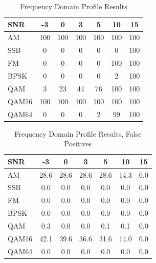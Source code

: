 \begin{table}
\caption{Frequency Domain Profile Results}
\centering
\begin{tabular}{ l | c | c | c | c | c | c } \hline
SNR   &	 -3 &	 0 &	 3 &	 5 &	 10 &	 15\\ \hline \hline 
AM    &	 100 &	 100 &	 100 &	 100 &	 100 &	 100 \\ \hline 
 SSB   &	 0 &	 0 &	 0 &	 0 &	 0 &	 100 \\ \hline 
FM    &	 0 &	 0 &	 0 &	 0 &	 100 &	 100 \\ \hline 
BPSK  &	 0 &	 0 &	 0 &	 0 &	 2 &	 100 \\ \hline 
QAM   &	 3 &	 23 &	 44 &	 76 &	 100 &	 100 \\ \hline 
QAM16 &	 100 &	 100 &	 100 &	 100 &	 100 &	 100 \\ \hline 
QAM64 &	 0 &	 0 &	 0 &	 2 &	 99 &	 100 \\ \hline 
\end{tabular}
\label{tab:CycloHits}
\end{table}

\begin{table}
\caption{Frequency Domain Profile Results, False Positives}
\centering
\begin{tabular}{ l | c | c | c | c | c | c } \hline
SNR   &	 -3 &	 0 &	 3 &	 5 &	 10 &	 15\\ \hline \hline 
AM &	 28.6 &	 28.6 &	 28.6 &	 28.6 &	 14.3 &	 0.0 \\ \hline 
 SSB &	 0.0 &	 0.0 &	 0.0 &	 0.0 &	 0.0 &	 0.0 \\ \hline 
FM &	 0.0 &	 0.0 &	 0.0 &	 0.0 &	 0.0 &	 0.0  \\ \hline 
BPSK &	 0.0 &	 0.0 &	 0.0 &	 0.0 &	 0.0 &	 0.0 \\ \hline 
QAM &	 0.3 &	 0.0 &	 0.0 &	 0.1 &	 0.1 &	 0.0 \\ \hline 
QAM16 &	 42.1 &	 39.6 &	 36.6 &	 31.6 &	 14.0 &	 0.0 \\ \hline 
QAM64 &	 0.0 &	 0.0 &	 0.0 &	 0.0 &	 0.0 &	 0.0 \\ \hline
\end{tabular}
\label{tab:CycloFalsePos}
\end{table}

